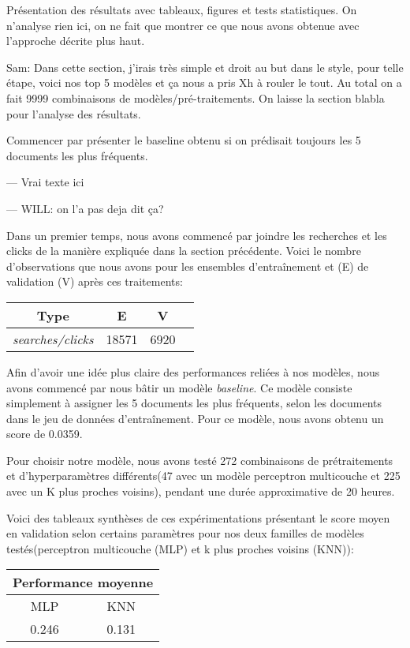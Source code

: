 Présentation des résultats avec tableaux, figures et tests statistiques.
On n'analyse rien ici, on ne fait que montrer ce que nous avons obtenue avec l'approche décrite plus haut.

Sam: Dans cette section, j'irais très simple et droit au but dans le style, pour telle étape, voici nos top 5 modèles et ça nous a pris Xh à rouler le tout.
Au total on a fait 9999 combinaisons de modèles/pré-traitements.
On laisse la section blabla pour l'analyse des résultats.

Commencer par présenter le baseline obtenu si on prédisait toujours les 5 documents les plus fréquents.

--- Vrai texte ici

--- WILL: on l'a pas deja dit ça?

Dans un premier temps, nous avons commencé par joindre les recherches et les clicks de la manière expliquée dans la section précédente. Voici le nombre d'observations que nous avons pour les ensembles d'entraînement et (E) de validation (V) après ces traitements:

\begin{center}
  \begin{tabular}{ |c|c|c|c| } 
     \hline
     Type & E & V \\
     \hline
     \hline
     \textit{searches/clicks} & 18571 & 6920 \\ 
     \hline
  \end{tabular}
\end{center}

Afin d'avoir une idée plus claire des performances reliées à nos modèles, nous avons commencé par nous bâtir un modèle \textit{baseline}. Ce modèle consiste simplement à assigner les 5 documents les plus fréquents, selon les documents dans le jeu de données d'entraînement. Pour ce modèle, nous avons obtenu un score de 0.0359.
\break


Pour choisir notre modèle, nous avons testé 272 combinaisons de prétraitements et d'hyperparamètres différents(47 avec un modèle perceptron multicouche et 225 avec un K plus proches voisins), pendant une durée approximative de 20 heures. 
\break

Voici des tableaux synthèses de ces expérimentations présentant le score moyen en validation selon certains paramètres pour nos deux familles de modèles testés(perceptron multicouche (MLP) et k plus proches voisins (KNN)):

\begin{center}
\begin{tabular}{|c|c|}
\hline
\multicolumn{2}{|c|}{\textbf{Performance moyenne}} \\ \hline
MLP & KNN \\ \hline
0.246 & 0.131 \\ \hline
\end{tabular}
\end{center}



